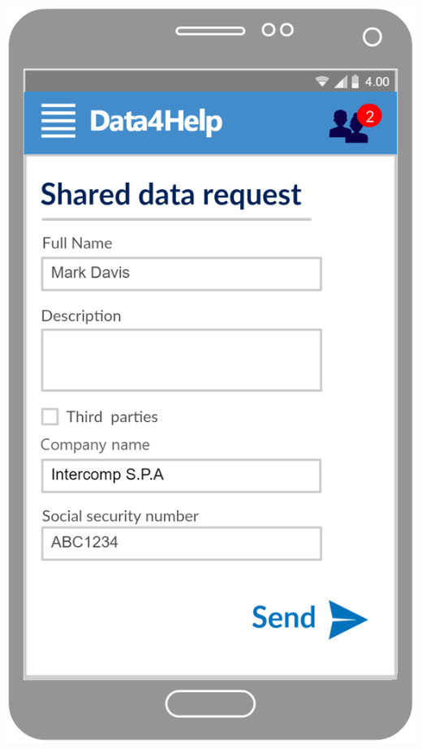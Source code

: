 \begin{center}
\begin{minipage}[c]{.40\textwidth}
\centering
\includegraphics[width=1\textwidth]{Images/userInterface/SendRequest}
\end{minipage}%
\hspace{10mm}%
\begin{minipage}[c]{.40\textwidth}
\centering

\end{minipage}
\end{center}
